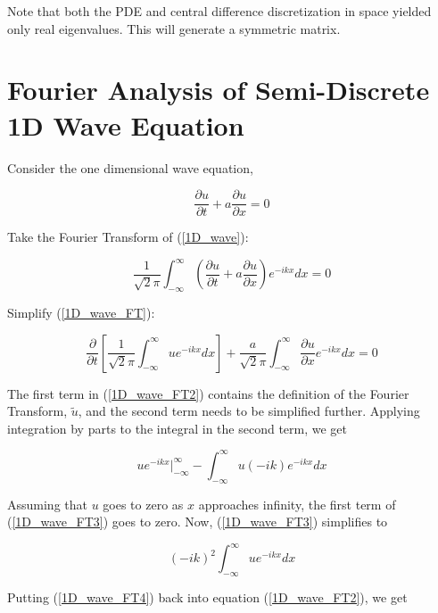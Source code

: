 \documentclass[10pt]{article}
\begin{document}
	Note that both the PDE and central difference discretization in space yielded only real eigenvalues. This will generate a symmetric matrix.
	
\section{Fourier Analysis of Semi-Discrete 1D Wave Equation}
	
	Consider the one dimensional wave equation,
	
	\begin{equation} \label{1D_wave}
		\frac{\partial u}{\partial t} + a \frac{\partial u}{\partial x} = 0
	\end{equation}
	
	Take the Fourier Transform of (\ref{1D_wave}):
	
	\begin{equation} \label{1D_wave_FT}
		\frac{1}{\sqrt{2}\pi} \int_{-\infty}^{\infty} \left( \frac{\partial u}{\partial t} + a \frac{\partial u}{\partial x} \right) e^{-ikx} dx = 0
	\end{equation}
	
	Simplify (\ref{1D_wave_FT}):
	
	\begin{equation} \label{1D_wave_FT2}
		\frac{\partial}{\partial t} \left[ \frac{1}{\sqrt{2}\pi} \int_{-\infty}^{\infty} u e^{-ikx} dx \right] + \frac{a}{\sqrt{2}\pi} \int_{-\infty}^{\infty} \frac{\partial u}{\partial x}  e^{-ikx} dx = 0
	\end{equation}
	
	The first term in (\ref{1D_wave_FT2}) contains the definition of the Fourier Transform, $\tilde{u}$, and the second term needs to be simplified further. Applying integration by parts to the integral in the second term, we get
	
	\begin{equation} \label{1D_wave_FT3}
		u e^{-ikx} \Big|_{-\infty}^{\infty} - \int_{-\infty}^{\infty} u (-ik) e^{-ikx} dx
	\end{equation}
	
	Assuming that $u$ goes to zero as $x$ approaches infinity, the first term of (\ref{1D_wave_FT3}) goes to zero. Now, (\ref{1D_wave_FT3}) simplifies to
	
	\begin{equation} \label{1D_wave_FT4}
		(-ik)^2 \int_{-\infty}^{\infty} u e^{-ikx} dx
	\end{equation}
	
	Putting (\ref{1D_wave_FT4}) back into equation (\ref{1D_wave_FT2}), we get
	
\end{document}
